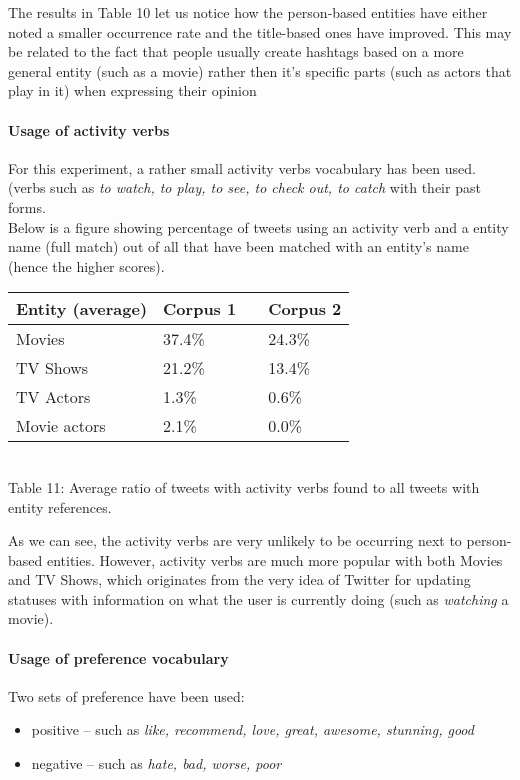 The results in Table 10 let us notice how the person-based entities have either noted a smaller
occurrence rate and the title-based ones have improved. This may be related to the
fact that people usually create hashtags based on a more general entity (such as
a movie) rather then it's specific parts (such as actors that play in it)
when expressing their opinion \cite{edinburg-corpus}

\paragraph{Usage of activity verbs}
For this experiment, a rather small activity verbs vocabulary has been used. (verbs such
as \textit{to watch, to play, to see, to check out, to catch} with their past forms.
\\ Below is a figure showing percentage of tweets using an activity verb
and a entity name (full match) out of all that have been matched with an
entity's name (hence the higher scores).

\begin{center}
  \begin{tabular}{ | p{4cm} | p{2cm} | p{1cm}| p{2cm} | } \hline
    Entity (average) & Corpus 1 & & Corpus 2 \\ \hline
    Movies & 37.4\% & & 24.3\% \\ \hline
    TV Shows & 21.2\% & & 13.4\% \\ \hline
    TV Actors & 1.3\% & & 0.6\% \\ \hline
    Movie actors & 2.1\% & & 0.0\% \\ \hline
  \end{tabular} \\
  Table 11: Average ratio of tweets with activity verbs found to all tweets with entity references. \\
\end{center}

As we can see, the activity verbs are very unlikely to be occurring next to
person-based entities. However, activity verbs are much more popular with both
Movies and TV Shows, which originates from the very idea of Twitter for
updating statuses with information on what the user is currently doing (such as \textit{watching}
a movie).

\paragraph{Usage of preference vocabulary}
Two sets of preference have been used:
\begin{itemize}
  \item positive -- such as \textit{like, recommend, love, great, awesome, stunning, good}
  \item negative -- such as \textit{hate, bad, worse, poor}
\end{itemize}


